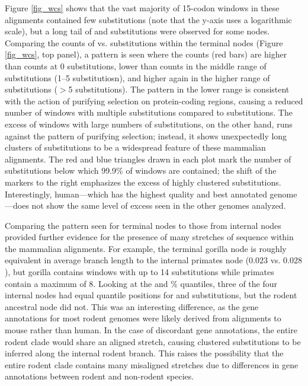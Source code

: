 Figure \ref{fig_wcs} shows that the vast majority of 15-codon windows
in these alignments contained few substitutions (note that the y-axis
uses a logarithmic scale), but a long tail of \nsyn and \syn
substitutions were observed for some nodes. Comparing the counts of
\nsyn vs. \syn substitutions within the terminal nodes (Figure
\ref{fig_wcs}, top panel), a pattern is seen where the \nsyn counts
(red bars) are higher than \syn counts at 0 substitutions, lower than
\syn counts in the middle range of substitutions (1--5 substitutiosn),
and higher again in the higher range of substitutions ($>$5
substitutions). The pattern in the lower range is consistent with the
action of purifying selection on protein-coding regions, causing a
reduced number of windows with multiple \nsyn substitutions compared
to \syn substitutions. The excess of windows with large numbers of
\nsyn substitutions, on the other hand, runs against the pattern of
purifying selection; instead, it shows unexpectedly long clusters of
\nsyn substitutions to be a widespread feature of these mammalian
alignments. The red and blue triangles drawn in each plot mark the
number of substitutions below which 99.9\% of windows are contained;
the shift of the \nsyn markers to the right emphasizes the excess of
highly clustered \nsyn substitutions. Interestingly, human---which has
the highest quality and best annotated genome---does not show the same
level of excess seen in the other genomes analyzed.

Comparing the pattern seen for terminal nodes to those from internal
nodes provided further evidence for the presence of many stretches of
\nhom sequence within the mammalian alignments. For example, the
terminal gorilla node is roughly equivalent in average branch length
to the internal primates node ($0.023$ vs. $0.028$), but gorilla
contains windows with up to 14 \nsyn substitutions while primates
contain a maximum of 8. Looking at the \nsyn and \%
quantiles, three of the four internal nodes had equal quantile
positions for \nsyn and \syn substitutions, but the rodent ancestral
node did not. This was an interesting difference, as the gene
annotations for most rodent genomes were likely derived from
alignments to mouse rather than human. In the case of discordant gene
annotations, the entire rodent clade would share an aligned \nhom
stretch, causing clustered substitutions to be inferred along the
internal rodent branch. This raises the possibility that the entire
rodent clade contains many misaligned \nhom stretches due to
differences in gene annotations between rodent and non-rodent
species.

